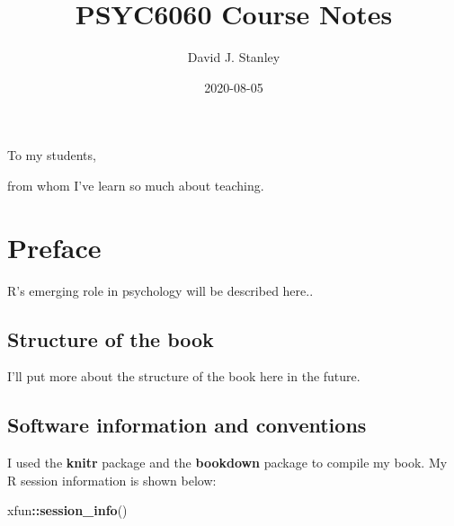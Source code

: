\documentclass[
]{krantz}
\title{PSYC6060 Course Notes}
\author{David J. Stanley}
\date{2020-08-05}
\makeatletter
\newenvironment{Shaded}{\begin{snugshade}}{\end{snugshade}}
\newcommand{\KeywordTok}[1]{\textcolor[rgb]{0.27,0.27,0.27}{\textbf{#1}}}
\newcommand{\NormalTok}[1]{#1}
\newcommand{\OperatorTok}[1]{\textcolor[rgb]{0.43,0.43,0.43}{\textbf{#1}}}
\newenvironment{kframe}{%
\medskip{}
\setlength{\fboxsep}{.8em}
 \def\at@end@of@kframe{}%
 \ifinner\ifhmode%
  \def\at@end@of@kframe{\end{minipage}}%
  \begin{minipage}{\columnwidth}%
 \fi\fi%
 \def\FrameCommand##1{\hskip\@totalleftmargin \hskip-\fboxsep
 \colorbox{shadecolor}{##1}\hskip-\fboxsep
     \hskip-\linewidth \hskip-\@totalleftmargin \hskip\columnwidth}%
 \MakeFramed {\advance\hsize-\width
   \@totalleftmargin\z@ \linewidth\hsize
   \@setminipage}}%
 {\par\unskip\endMakeFramed%
 \at@end@of@kframe}
\renewenvironment{Shaded}{\begin{kframe}}{\end{kframe}}
\makeatother
\begin{document}
\maketitle


\thispagestyle{empty}

\begin{center}
To my students,

from whom I've learn so much about teaching.
\end{center}

\setlength{\abovedisplayskip}{-5pt}
\setlength{\abovedisplayshortskip}{-5pt}

{
\hypersetup{linkcolor=}
\setcounter{tocdepth}{2}
\tableofcontents
}
\listoftables
\listoffigures
\hypertarget{preface}{%
\chapter*{Preface}\label{preface}}


R's emerging role in psychology will be described here..

\hypertarget{structure-of-the-book}{%
\section*{Structure of the book}\label{structure-of-the-book}}


I'll put more about the structure of the book here in the future.

\hypertarget{software-information-and-conventions}{%
\section*{Software information and conventions}\label{software-information-and-conventions}}


I used the \textbf{knitr} package \citep{xie2015} and the \textbf{bookdown} package \citep{R-bookdown} to compile my book. My R session information is shown below:

\begin{Shaded}
\begin{Highlighting}[]
\NormalTok{xfun}\OperatorTok{::}\KeywordTok{session_info}\NormalTok{()}
\end{Highlighting}
\end{Shaded}
\end{document}
